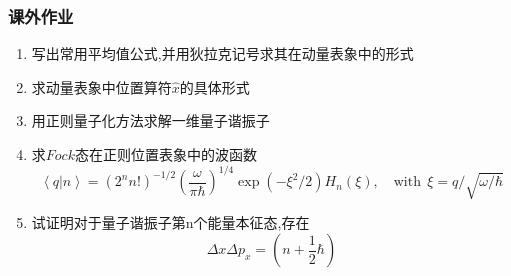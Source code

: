 \begin{frame}
    \frametitle{课外作业}
    \begin{enumerate}
        \item 写出常用平均值公式,并用狄拉克记号求其在动量表象中的形式
        \item 求动量表象中位置算符$\hat{x}$的具体形式
        \item 用正则量子化方法求解一维量子谐振子
        \item 求$Fock$态在正则位置表象中的波函数
                \[\left\langle q|n \right\rangle = (2^n n!)^{-1/2} ( \frac{\omega}{\pi \hbar})^{1/4} \exp(-\xi^2 /2) H_n (\xi), \quad \text{with}~~ \xi= q/\sqrt{\omega/\hbar}\]
        \item 试证明对于量子谐振子第n个能量本征态,存在 
                \[  \Delta x \Delta p_x = (n+\frac{1}{2}\hbar)   \]
    \end{enumerate}
\end{frame}
